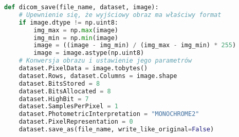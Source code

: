 \documentclass[a4paper]{article}
\begin{document}
\begin{lstlisting}[language=Python, caption=Zapis pliku DICOM, texcl=true]
def dicom_save(file_name, dataset, image):
    # Upewnienie się, że wyjściowy obraz ma właściwy format
    if image.dtype != np.uint8:
        img_max = np.max(image)
        img_min = np.min(image)
        image = ((image - img_min) / (img_max - img_min) * 255)
        image = image.astype(np.uint8)
    # Konwersja obrazu i ustawienie jego parametrów
    dataset.PixelData = image.tobytes()
    dataset.Rows, dataset.Columns = image.shape
    dataset.BitsStored = 8
    dataset.BitsAllocated = 8
    dataset.HighBit = 7
    dataset.SamplesPerPixel = 1
    dataset.PhotometricInterpretation = "MONOCHROME2"
    dataset.PixelRepresentation = 0
    dataset.save_as(file_name, write_like_original=False)
    \end{lstlisting}
\end{document}
